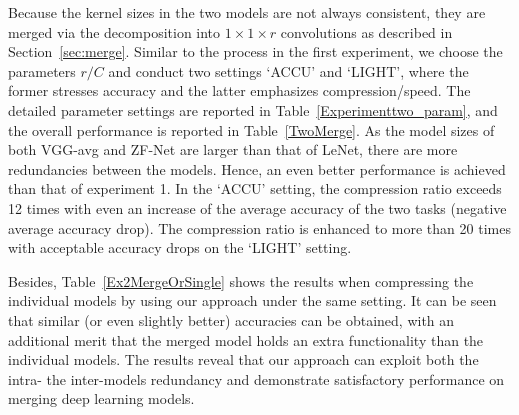 \documentclass{article}
\begin{document}
	Because the kernel sizes in the two models are not always consistent, they are merged via the decomposition into $1\times 1 \times r$ convolutions as described in Section~\ref{sec:merge}.
	Similar to the process in the first experiment, we choose the parameters $r/C$ and conduct two settings `ACCU' and `LIGHT', where the former stresses accuracy and the latter emphasizes compression/speed. The detailed parameter settings are reported in Table~\ref{Experimenttwo_param}, and the overall performance is reported in Table~\ref{TwoMerge}.
	As the model sizes of both VGG-avg and ZF-Net are larger than that of LeNet, there are more redundancies between the models.
	Hence, an even better performance is achieved than that of experiment 1.
	In the `ACCU' setting, the compression ratio exceeds 12 times with even an increase of the average accuracy of the two tasks (negative average accuracy drop).
	The compression ratio is enhanced to more than 20 times with acceptable accuracy drops on the `LIGHT' setting.
	
	Besides, Table~\ref{Ex2MergeOrSingle} shows the results when compressing the individual models by using our approach under the same setting.
	It can be seen that similar (or even slightly better) accuracies can be obtained, with an additional merit that the merged model holds an extra functionality than the individual models.
	The results reveal that our approach can exploit both the intra- the inter-models redundancy and demonstrate satisfactory performance on merging deep learning models.
	
	
	
\end{document}
